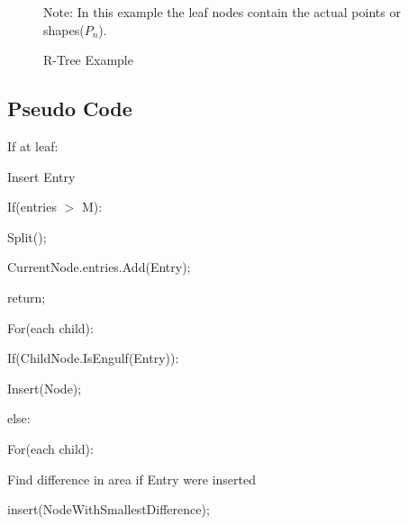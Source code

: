\documentclass{article}
\begin{document}
\begin{figure}
\caption{R-Tree Example}
\centering
{}

Note: In this example the leaf nodes contain the actual points or shapes($P_n$).
\end{figure}



\subsection*{Pseudo Code}
\begin{flushleft}

    
If at leaf:

\quad Insert Entry

\quad If(entries $>$ M):

\quad \quad Split();

\quad CurrentNode.entries.Add(Entry);

\quad return;


For(each child):


\quad If(ChildNode.IsEngulf(Entry)):

 \quad \quad Insert(Node);


else:

\quad For(each child):

    \quad \quad
    Find difference in area if Entry were inserted

    \quad insert(NodeWithSmallestDifference);
\end{flushleft}
\end{document}
